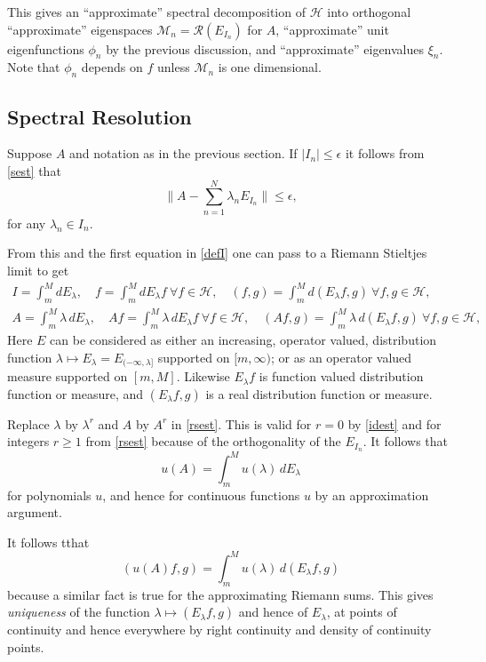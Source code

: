 \documentclass[a4paper]{amsart}
\theoremstyle{plain}
\theoremstyle{definition}
\theoremstyle{remark}
\begin{document}
This gives an ``approximate'' spectral decomposition of $\mathcal{H} $ into orthogonal ``approximate'' eigenspaces $ \mathcal{M}_n = \mathcal{R} (E_{I_n})$ for $ A $, ``approximate'' unit eigenfunctions $\phi_n $  by the previous discussion,   and ``approximate'' eigenvalues $ \xi_n  $. 
Note that   $ \phi_n $ depends on $ f $ unless   $ \mathcal{M}_n $ is one dimensional.

\subsection{Spectral Resolution}
Suppose $ A $ and notation as in the previous section.  If $ |I_n| \leq \epsilon $ it follows from \eqref{sest}
that 
\begin{equation} \label{rsest} 
\| A - \sum_{n=1}^N \lambda_n E_{I_n} \| \leq \epsilon ,
\end{equation} 
for any $ \lambda_n \in I_n $.

From this and the first equation in \eqref{defI} one can pass to a Riemann Stieltjes limit to get
\begin{gather*}
I = \int_m^M   dE_\lambda , \quad  f = \int_m^M  dE_\lambda f \ \forall f \in \mathcal{H} ,
\quad (f,g) = \int_m^M  d(E_\lambda f ,g)\ \forall f,g \in \mathcal{H} ,\\
A = \int_m^M \lambda \, dE_\lambda , \quad Af = \int_m^M \lambda \, dE_\lambda f \ \forall f \in \mathcal{H} ,
\quad (Af,g) = \int_m^M \lambda \, d(E_\lambda f ,g)\ \forall f,g \in \mathcal{H} ,
\end{gather*}
Here $ E $ can be considered as either an increasing, operator valued, distribution function $ \lambda \mapsto E_\lambda  =E_{(-\infty, \lambda ]} $ supported on $ [m,\infty ) $; or as an operator valued measure  supported on $ [m,M] $.  Likewise $ E_\lambda f $ is function valued distribution function or measure, and $ (E_\lambda f ,g)$ is a real distribution function or measure.

\medskip
Replace $ \lambda $ by $ \lambda ^r $ and $ A $ by $ A^r $ in \eqref{rsest}.  This is valid for $ r=0 $ by \eqref{idest} and for integers $ r\geq 1 $ from \eqref{rsest} because of the orthogonality of the $ E_{I_n}$.
It follows that 
\[
u(A) = \int_m^M u(\lambda)\, dE_\lambda  
\]
for polynomials $u $, and hence for continuous functions $ u $ by an approximation argument.

It follows tthat
\[
(u(A)f,g)  = \int_m^M u(\lambda)\, d(E_\lambda  f,g)
\]
because a similar fact is true for the approximating Riemann sums.  This gives \emph{uniqueness} of the function  $ 
\lambda \mapsto (E_\lambda  f,g) $ and hence of $ E_\lambda $,  at points of continuity and hence everywhere by right continuity and density of continuity points.
\end{document}
